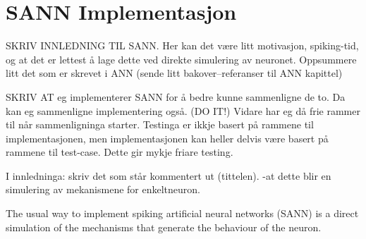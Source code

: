 
%






\section{SANN Implementasjon}


	SKRIV INNLEDNING TIL SANN.
	Her kan det være litt motivasjon, spiking-tid, og at det er lettest å lage dette ved direkte simulering av neuronet.
	Oppsummere litt det som er skrevet i ANN (sende litt bakover--referanser til ANN kapittel)

	SKRIV AT eg implementerer SANN for å bedre kunne sammenligne de to. Da kan eg sammenligne implementering også. (DO IT!)
	Vidare har eg då frie rammer til når sammenligninga starter. Testinga er ikkje basert på rammene til implementasjonen, men implementasjonen kan heller delvis være basert på rammene til test-case. Dette gir mykje friare testing.

	I innledninga: skriv det som står kommentert ut (tittelen). -at dette blir en simulering av mekanismene for enkeltneuron.


	The usual way to implement spiking artificial neural networks (SANN) is a direct simulation of the mechanisms that generate the behaviour of the neuron.
	

